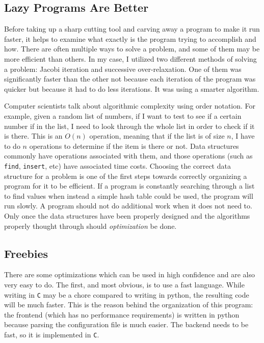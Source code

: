 \subsection{Lazy Programs Are Better}

Before taking up a sharp cutting tool and carving away a program to make it run faster, it helps to examine
what exactly is the program trying to accomplish and how. There are often multiple ways to solve a problem,
and some of them may be more efficient than others. In my case, I utilized two different methods of solving
a problem: Jacobi iteration and successive over-relaxation. One of them was significantly faster than the other
not because each iteration of the program was quicker but because it had to do less iterations. It was using a
smarter algorithm.

Computer scientists talk about algorithmic complexity using order notation. For example, given a random list
of numbers, if I want to test to see if a certain number if in the list, I need to look through the whole
list in order to check if it is there. This is an $O(n)$ operation, meaning that if the list is of size $n$, I
have to do $n$ operations to determine if the item is there or not. Data structures commonly have operations
associated with them, and those operations (such as \texttt{find}, \texttt{insert}, etc) have associated
time costs. Choosing the correct data structure for a problem is one of the first steps towards correctly
organizing a program for it to be efficient. If a program is constantly searching through a list to find
values when instead a simple hash table could be used, the program will run slowly. A program should not
do additional work when it does not need to. Only once the data structures have been properly designed
and the algorithms properly thought through should \textit{optimization} be done.

\subsection{Freebies}

There are some optimizations which can be used in high confidence and are also very easy to do.
The first, and most obvious, is to use a fast language. While writing in \texttt{C} may be a chore
compared to writing in python, the resulting code will be much faster. This is the reason behind the
organization of this program: the frontend (which has no performance requirements) is written in
python because parsing the configuration file is much easier. The backend needs to be fast, so it
is implemented in \texttt{C}.


